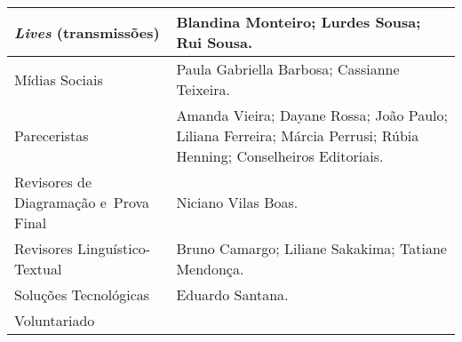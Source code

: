 \documentclass{gescons}
\begin{document}
\begin{longtable}[]{@{}
  >{\raggedright\arraybackslash}p{}
  >{\raggedright\arraybackslash}p{}@{}}
\begin{minipage}[t]{\linewidth}
\emph{Lives} (transmissões)
\end{minipage} & \begin{minipage}[t]{\linewidth}\raggedright
Blandina Monteiro; Lurdes Sousa; Rui Sousa.
\end{minipage} \\
\hline
\begin{minipage}[t]{\linewidth}\raggedright
Mídias Sociais
\end{minipage} & \begin{minipage}[t]{\linewidth}\raggedright
Paula Gabriella Barbosa; Cassianne Teixeira.
\end{minipage} \\
\hline
\begin{minipage}[t]{\linewidth}\raggedright
Pareceristas
\end{minipage} & \begin{minipage}[t]{\linewidth}\raggedright
Amanda Vieira; Dayane Rossa; João Paulo; Liliana Ferreira; Márcia Perrusi; Rúbia Henning; Conselheiros Editoriais.
\end{minipage} \\ \addlinespace[2pt]
\hline
\begin{minipage}[t]{\linewidth}\raggedright
Revisores de Diagramação e~Prova Final
\end{minipage} & \begin{minipage}[t]{\linewidth}\raggedright
Niciano Vilas Boas.
\end{minipage} \\ \addlinespace[4pt]
\hline
\begin{minipage}[t]{\linewidth}\raggedright
Revisores Linguístico-Textual
\end{minipage} & \begin{minipage}[t]{\linewidth}\raggedright
Bruno Camargo; Liliane Sakakima; Tatiane Mendonça.
\end{minipage} \\
\hline
\begin{minipage}[t]{\linewidth}\raggedright
Soluções Tecnológicas
\end{minipage} & \begin{minipage}[t]{\linewidth}\raggedright
Eduardo Santana.
\end{minipage} \\
\hline
\begin{minipage}[t]{\linewidth}\raggedright
Voluntariado
\end{minipage} & \begin{minipage}[t]{\linewidth}\raggedright

\end{minipage}
\end{longtable}
\end{document}
